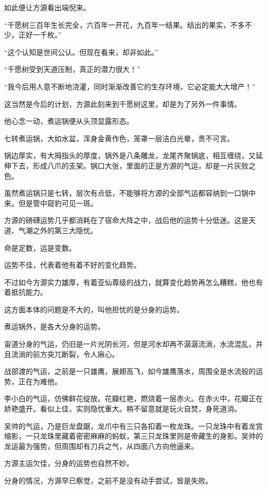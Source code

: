 \begin{this_body}
如此便让方源看出端倪来。

“千愿树三百年生长完全，六百年一开花，九百年一结果。结出的果实，不多不少，正好一千枚。”

“这个认知是世间公认。但现在看来，却非如此。”

“千愿树受到天道压制，真正的潜力很大！”

“我今后用人意不断地浇灌，同时渐渐改善它的生存环境，它必定能大大增产！”

这当然是今后的计划，方源此刻来到千愿树这里，却是为了另外一件事情。

他心念一动，煮运锅便从头顶显露形态。

七转煮运锅，大如水盆，浑身金黄作色，笼罩一层洁白光晕，贵不可言。

锅边厚实，有大拇指头的厚度，锅外是八条雕龙，龙尾齐聚锅底，相互缠绕，又延伸下去，形成八爪的支架。锅口大张，里面的正是方源的气运，却是一片灰败之色。

虽然煮运锅只是七转，层次有点低，不能够将方源的全部气运都容纳到一口锅中来。但是管中窥豹可见一斑。

方源的磅礴运势几乎都消耗在了宿命大阵之中，战后他的运势十分低迷。这是天道、气潮之外的第三大隐忧。

命是定数，运是变数。

运势不佳，代表着他有着不好的变化趋势。

不过如今方源实力雄厚，有着亚仙尊级的战力，就算变化趋势再怎么糟糕，他也有着抵抗能力。

这方面本体的问题是不大的，叫他担忧的是分身的运势。

煮运锅外，是各大分身的运势。

宙道分身的气运，仍旧是一片光阴长河，但是河水却再不潺潺流淌，水流混乱，并且流淌的前方突兀断裂，令人揪心。

战部渡的气运，之前是一只雄鹰，展翅高飞，如今雄鹰落水，周围全是水流般的运势，正在为难他。

李小白的气运，仿佛鲜花绽放。花瓣红艳，燃烧着一层赤火。在赤火中，花瓣正在娇艳盛开。看似上佳，实则隐忧重大。稍不留意就是玩火自焚，身死道消。

吴帅的气运，乃是巨龙盘踞，龙爪中有三只各扣着一枚龙珠。一只龙珠中有着龙宫缩影，一只龙珠里藏着密密麻麻的蚂蚁，第三只龙珠里则是帝藏生的身影。吴帅的龙运最为强势，但周围却有刀兵之气，从四面八方向他逼来。

方源主运欠佳，分身的运势也自然不妙。

分身的情况，方源早已察觉，之前不是没有动手尝试，皆是失败。


\end{this_body}
